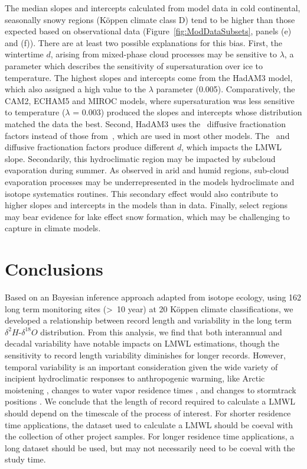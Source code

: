 \documentclass[draft, linenumbers]{agujournal2018}
\begin{document}
The median slopes and intercepts calculated from model data in cold continental, seasonally snowy regions (K{\"o}ppen climate class D) tend to be higher than those expected based on observational data (Figure~\ref{fig:ModDataSubsets}, panels (e) and (f)). There are at least two possible explanations for this bias. First, the wintertime $d$, arising from mixed-phase cloud processes may be sensitive to $\lambda$, a parameter which describes the sensitivity of supersaturation over ice to temperature. The highest slopes and intercepts come from the HadAM3 model, which also assigned a high value to the $\lambda$ parameter (0.005). Comparatively, the CAM2, ECHAM5 and MIROC models, where supersaturation was less sensitive to temperature ($\lambda$ = 0.003) produced the slopes and intercepts whose distribution matched the data the best. Second, HadAM3 uses the~\citet{Cappa2003} diffusive fractionation factors instead of those from~\citet{Merlivat1979}, which are used in most other models. The~\citet{Cappa2003} and~\citet{Merlivat1979} diffusive fractionation factors produce different $d$, which impacts the LMWL slope. Secondarily, this hydroclimatic region may be impacted by subcloud evaporation during summer. As observed in arid and humid regions, sub-cloud evaporation processes may be underrepresented in the models hydroclimate and isotope systematics routines. This secondary effect would also contribute to higher slopes and intercepts in the models than in data. Finally, select regions may bear evidence for lake effect snow formation, which may be challenging to capture in climate models.

\section{Conclusions}
Based on an Bayesian inference approach adapted from isotope ecology, using 162 long term monitoring sites (\textgreater\ 10 year) at 20 K{\"o}ppen climate classifications, we developed a relationship between record length and variability in the long term $\delta^{2}H$-$\delta^{18}O$ distribution. From this analysis, we find that both interannual and decadal variability have notable impacts on LMWL estimations, though the sensitivity to record length variability diminishes for longer records. However, temporal variability is an important consideration given the wide variety of incipient hydroclimatic responses to anthropogenic warming, like Arctic moistening \citep{Bintanja2014}, changes to water vapor residence times \citep{Held2006}, and changes to stormtrack positions \citep{Marvel2013}. We conclude that the length of record required to calculate a LMWL should depend on the timescale of the process of interest. For shorter residence time applications, the dataset used to calculate a LMWL should be coeval with the collection of other project samples. For longer residence time applications, a long dataset should be used, but may not necessarily need to be coeval with the study time.
\end{document}
